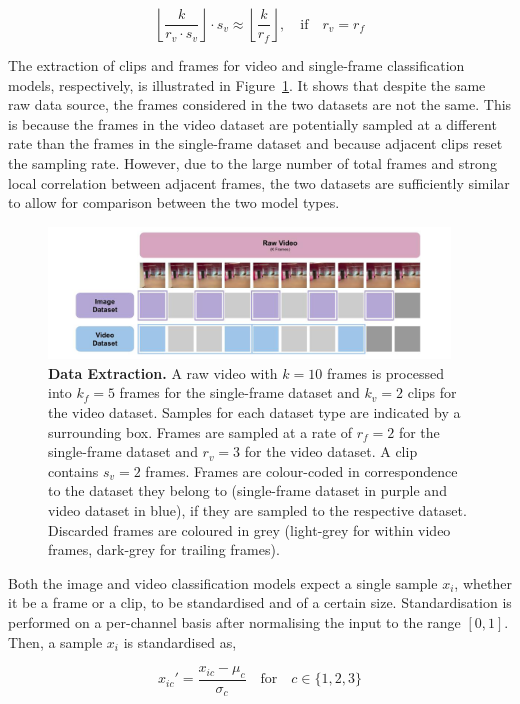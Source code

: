 \documentclass[a4paper]{article}
\begin{document}
\[
  \left\lfloor \frac{k}{r_v \cdot s_v} \right\rfloor \cdot s_v \approx
  \left\lfloor \frac{k}{r_f} \right\rfloor, \quad \text{if} \quad r_v = r_f
\]

The extraction of clips and frames for video and single-frame classification
models, respectively, is illustrated in Figure~\ref{fig:data-extraction}. It
shows that despite the same raw data source, the frames considered in the two
datasets are not the same. This is because the frames in the video dataset are
potentially sampled at a different rate than the frames in the single-frame
dataset and because adjacent clips reset the sampling rate. However, due to
the large number of total frames and strong local correlation between adjacent
frames, the two datasets are sufficiently similar to allow for comparison
between the two model types.

\begin{figure}[ht]
\centering
\includegraphics[width=0.95\textwidth]{figures/data-extraction.png}
\caption{
  \textbf{Data Extraction.} A raw video with $k=10$ frames is processed into
  $k_f=5$ frames for the single-frame dataset and $k_v=2$ clips for the
  video dataset. Samples for each dataset type are indicated by a
  surrounding box. Frames are sampled at a rate of $r_f=2$ for the
  single-frame dataset and $r_v=3$ for the video dataset. A clip contains
  $s_v=2$ frames. Frames are colour-coded in correspondence to the dataset
  they belong to (single-frame dataset in purple and video dataset in blue),
  if they are sampled to the respective dataset. Discarded frames are
  coloured in grey (light-grey for within video frames, dark-grey for
  trailing frames).}
\label{fig:data-extraction}
\end{figure}

Both the image and video classification models expect a single sample
$x_i$, whether it be a frame or a clip, to be standardised and of a certain
size. Standardisation is performed on a per-channel basis after normalising
the input to the range $[0, 1]$. Then, a sample $x_i$ is standardised as,

\[
  x_{ic}' = \frac{x_{ic} - \mu_c}{\sigma_c} \quad \text{for} \quad c \in \{1, 2, 3\}
\]
\end{document}
